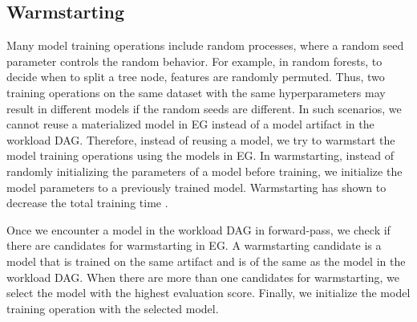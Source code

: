 \subsection{Warmstarting}
Many model training operations include random processes, where a random seed parameter controls the random behavior.
For example, in random forests, to decide when to split a tree node, features are randomly permuted.
Thus, two training operations on the same dataset with the same hyperparameters may result in different models if the random seeds are different.
In such scenarios, we cannot reuse a materialized model in EG instead of a model artifact in the workload DAG.
Therefore, instead of reusing a model, we try to warmstart the model training operations using the models in EG.
In warmstarting, instead of randomly initializing the parameters of a model before training, we initialize the model parameters to a previously trained model.
Warmstarting has shown to decrease the total training time \cite{baylor2017tfx}.

Once we encounter a model in the workload DAG in forward-pass, we check if there are candidates for warmstarting in EG.
A warmstarting candidate is a model that is trained on the same artifact and is of the same as the model in the workload DAG.
When there are more than one candidates for warmstarting, we select the model with the highest evaluation score.
Finally, we initialize the model training operation with the selected model.
